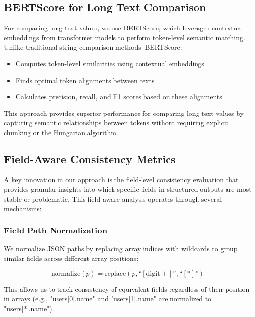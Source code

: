 \documentclass[letterpaper]{article} %
\begin{document}
\subsection{BERTScore for Long Text Comparison}

For comparing long text values, we use BERTScore, which leverages contextual embeddings from transformer models to perform token-level semantic matching. Unlike traditional string comparison methods, BERTScore:

\begin{itemize}
\item Computes token-level similarities using contextual embeddings
\item Finds optimal token alignments between texts
\item Calculates precision, recall, and F1 scores based on these alignments
\end{itemize}

This approach provides superior performance for comparing long text values by capturing semantic relationships between tokens without requiring explicit chunking or the Hungarian algorithm.

\subsection{Field-Aware Consistency Metrics}

A key innovation in our approach is the field-level consistency evaluation that provides granular insights into which specific fields in structured outputs are most stable or problematic. This field-aware analysis operates through several mechanisms:

\subsubsection{Field Path Normalization}

We normalize JSON paths by replacing array indices with wildcards to group similar fields across different array positions:

\begin{equation}
\text{normalize}(p) = \text{replace}(p, \text{``}[\text{digit}+]\text{''},\text{``}[*]\text{''})
\end{equation}

This allows us to track consistency of equivalent fields regardless of their position in arrays (e.g., "users[0].name" and "users[1].name" are normalized to "users[*].name").
\end{document}
